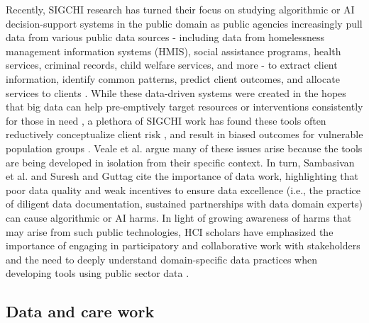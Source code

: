 Recently, SIGCHI research has turned their focus on studying algorithmic or AI decision-support systems in the public domain as public agencies increasingly pull data from various public data sources - including data from homelessness management information systems (HMIS), social assistance programs, health services, criminal records, child welfare services, and more - to extract client information, identify common patterns, predict client outcomes, and allocate services to clients \cite{kithulgoda_predictive_2022, afst_documentation, eubanks2018automating, toros18}. While these data-driven systems were created in the hopes that big data can help pre-emptively target resources or interventions consistently for those in need \cite{Dencik_2019}, a plethora of SIGCHI work has found these tools often reductively conceptualize client risk \cite{brown19, saxena2020human, moongi24}, and result in biased outcomes for vulnerable population groups \cite{ feng22, stapleton22}. Veale et al. \cite{veale18} argue many of these issues arise because the tools are being developed in isolation from their specific context. In turn, Sambasivan et al. \cite{sambasivan21} and Suresh and Guttag \cite{suresh21} cite the importance of data work, highlighting that poor data quality and weak incentives to ensure data excellence (i.e., the practice of diligent data documentation, sustained partnerships with data domain experts) can cause algorithmic or AI harms. In light of growing awareness of harms that may arise from such public technologies, HCI scholars have emphasized the importance of engaging in participatory and collaborative work with stakeholders and the need to deeply understand domain-specific data practices when developing tools using public sector data \cite{saxena2021framework2, saxena2020human, kawakami2022, kuo23, showkat23}. 

\subsection{Data and care work}

